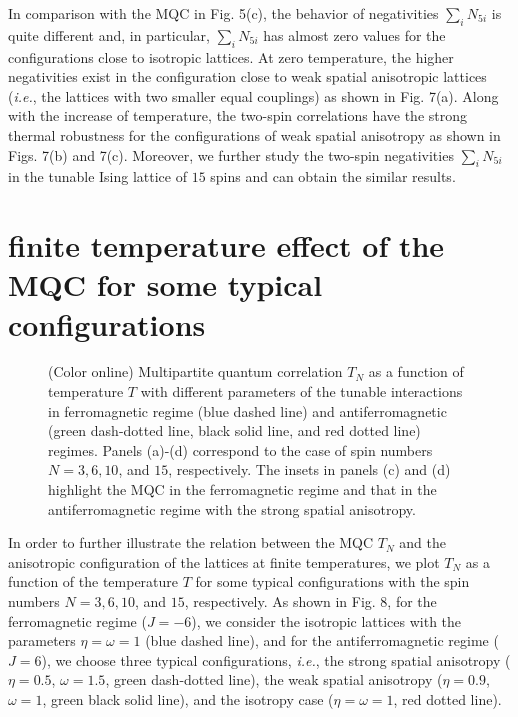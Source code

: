 \documentclass[pra,aps,twocolumn,showpacs]{revtex4}
\begin{document}
In comparison with the MQC in Fig. 5(c), the behavior of negativities $\sum_i N_{5i}$ is quite different and, in particular, $\sum_i N_{5i}$ has almost zero values for the configurations close to isotropic lattices. At zero temperature, the higher negativities exist in the configuration close to weak spatial anisotropic lattices (\emph{i.e.}, the lattices with two smaller equal couplings) as shown in Fig. 7(a). Along with the increase of temperature, the two-spin correlations have the strong thermal robustness for the configurations of weak spatial anisotropy as shown in Figs. 7(b) and 7(c). Moreover, we further study the two-spin negativities $\sum_i N_{5i}$ in the tunable Ising lattice of $15$ spins and can obtain the similar results.

\section{finite temperature effect of the MQC for some typical configurations}

\begin{figure}
	\caption{(Color online) Multipartite quantum correlation $T_N$ as a function of temperature $T$ with different parameters of the tunable interactions in ferromagnetic regime (blue dashed line) and antiferromagnetic (green dash-dotted line, black solid line, and red dotted line) regimes. Panels (a)-(d) correspond to the case of spin numbers $N=3, 6, 10$, and $15$, respectively. The insets in panels (c) and (d) highlight the MQC in the ferromagnetic regime and that in the antiferromagnetic regime with the strong spatial anisotropy.}
\end{figure}

In order to further illustrate the relation between the MQC $T_N$ and the anisotropic configuration of the lattices at finite temperatures, we plot $T_N$ as a function of the temperature $T$ for some typical configurations with the spin numbers $N=3, 6, 10$, and $15$, respectively. As shown in Fig. 8, for the ferromagnetic regime  ($J=-6$), we consider the isotropic lattices with the parameters $\eta=\omega=1$ (blue dashed line), and for the antiferromagnetic regime ($J=6$), we choose three typical configurations, \emph{i.e.}, the strong spatial anisotropy ($\eta=0.5$, $\omega=1.5$, green dash-dotted line), the weak spatial anisotropy ($\eta=0.9$, $\omega=1$, green black solid line), and the isotropy case ($\eta=\omega=1$, red dotted line).
\end{document}
